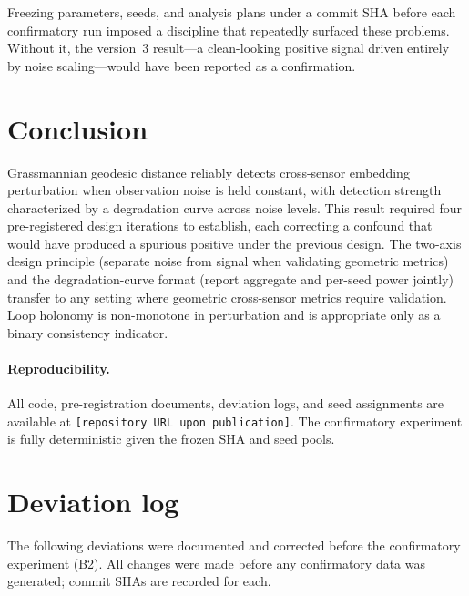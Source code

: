 \documentclass[11pt]{article}
\begin{document}
Freezing parameters, seeds, and analysis plans under a commit SHA
before each confirmatory run imposed a discipline that repeatedly
surfaced these problems.  Without it, the version~3 result---a
clean-looking positive signal driven entirely by noise
scaling---would have been reported as a confirmation.

\section{Conclusion}
\label{sec:conclusion}

Grassmannian geodesic distance reliably detects cross-sensor
embedding perturbation when observation noise is held constant,
with detection strength characterized by a degradation curve across
noise levels.  This result required four pre-registered design
iterations to establish, each correcting a confound that would have
produced a spurious positive under the previous design.  The
two-axis design principle (separate noise from signal when
validating geometric metrics) and the degradation-curve format
(report aggregate and per-seed power jointly) transfer to any
setting where geometric cross-sensor metrics require validation.
Loop holonomy is non-monotone in perturbation and is appropriate
only as a binary consistency indicator.

\paragraph{Reproducibility.}
All code, pre-registration documents, deviation logs, and seed
assignments are available at
\texttt{[repository URL upon publication]}.  The confirmatory
experiment is fully deterministic given the frozen SHA and seed
pools.




\appendix

\section{Deviation log}
\label{app:deviations}

The following deviations were documented and corrected before the
confirmatory experiment (B2).  All changes were made before any
confirmatory data was generated; commit SHAs are recorded for each.
\end{document}
